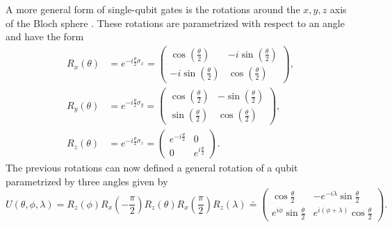 \documentclass[10pt]{article}
\begin{document}
	A more general form of single-qubit gates is the rotations around the $x,y,z$ axis of the Bloch sphere \citet{Nielsen2011QuantumComputing}. These rotations are parametrized with respect to an angle and have the form
	\begin{equation}
		\begin{aligned}
			R_{x}(\theta) &=  e^{-i\frac{\theta}{2}\sigma_x} = \begin{pmatrix}
				\cos(\frac{\theta}{2})   & -i\sin(\frac{\theta}{2}) \\
				-i\sin(\frac{\theta}{2}) & \cos(\frac{\theta}{2})
			\end{pmatrix},\\
			R_{y}(\theta) &=  e^{-i\frac{\theta}{2}\sigma_y} = \begin{pmatrix}
				\cos(\frac{\theta}{2})  & -\sin(\frac{\theta}{2}) \\
				\sin(\frac{\theta}{2}) & \cos(\frac{\theta}{2})
			\end{pmatrix},\\
			R_{z}(\theta) &=  e^{-i\frac{\theta}{2}\sigma_z} = \begin{pmatrix}
				e^{-i\frac{\theta}{2}} & 0                     \\
				0                      & e^{i\frac{\theta}{2}}
			\end{pmatrix}.
		\end{aligned}
	\end{equation}
	The previous rotations can now defined a general rotation of a qubit parametrized by three angles given by 
	\begin{equation}
		U(\theta,\phi,\lambda) = R_z(\phi)R_x(-\frac{\pi}{2})R_z(\theta)R_x(\frac{\pi}{2})R_z(\lambda) \doteq \begin{pmatrix}
			\cos\frac{\theta}{2} & -e^{-i\lambda}\sin\frac{\theta}{2}\\
			e^{i\phi}\sin\frac{\theta}{2}& e^{i(\phi + \lambda)}\cos\frac{\theta}{2}
		\end{pmatrix}	.
	\end{equation}
	
\end{document}
